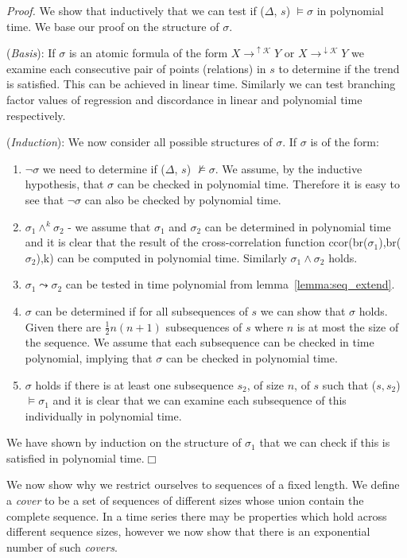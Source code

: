\smallskip

{\em Proof.} We show that inductively that we can test if  
($\Delta$, $s$) $\models \sigma$ in
polynomial time. We base our proof on the structure of $\sigma$.

\smallskip
({\em Basis}): If $\sigma$ is an atomic formula of the form $X
\to^{\uparrow\mathcal{K}} Y$ or  $X \to^{\downarrow\mathcal{K}} Y$ we
examine each consecutive pair of points (relations) in $s$ to determine if the trend
is satisfied. This can be achieved in linear time. Similarly we can
test branching factor values of regression and discordance in linear
and polynomial time respectively.

\smallskip
({\em Induction}): We now consider all possible structures of
$\sigma$. If $\sigma$ is of the form:
\begin{enumerate}
\item $\neg \sigma$  we need to determine if ($\Delta$, $s$)
$\not\models \sigma$. We assume, by the inductive hypothesis, that
$\sigma$ can be checked in polynomial time. Therefore it is easy to
see that $\neg \sigma$ can also be checked by polynomial time.
\item $\sigma_1 \wedge^k \sigma_2$ - we assume that $\sigma_1$ and
$\sigma_2$ can be determined in polynomial time and it is clear that
the result of the cross-correlation function
ccor(br($\sigma_1$),br($\sigma_2$),k) can be computed in polynomial
time. Similarly $\sigma_1 \wedge \sigma_2$ holds.
\item $\sigma_1 \leadsto \sigma_2$ can be tested in time polynomial
from lemma~\ref{lemma:seq_extend}.  
\item {} $\sigma$ can be determined if for all subsequences of $s$
we can show that $\sigma$ holds.  Given  there
are $\frac{1}{2} n(n+1)$ subsequences of $s$ where $n$ is at most the
size of the sequence. We assume that each
subsequence can be checked in time polynomial, implying that 
$\sigma$ can be checked in polynomial time.
\item {} $\sigma$ holds if there is at least one subsequence
$s_2$, of size $n$,
of $s$ such that ($s, s_2$) $\models \sigma_1$ and it is clear
that we can examine each subsequence of this individually in
polynomial time.
\end{enumerate}
We have shown by induction on the structure of $\sigma_1$ that we can
check if this is satisfied in polynomial time.$\Box$
 

We now show why we restrict ourselves to sequences of a fixed
length. We define a {\em cover} to be a set of sequences of different
sizes whose union contain the complete sequence. In a time series
there may be properties which hold across different sequence sizes,
however we now show that there is an exponential number of such {\em
covers}.  

